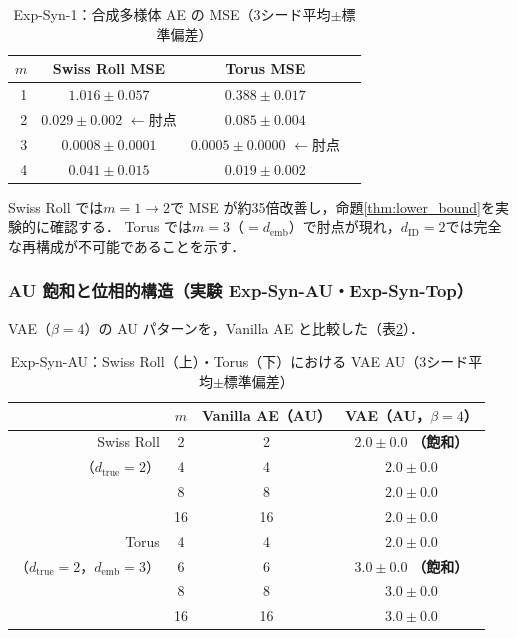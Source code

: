 \documentclass[11pt,a4paper]{jsarticle}
\newcommand{\dID}{d_{\mathrm{ID}}}
\newcommand{\dtrue}{d_{\mathrm{true}}}
\newcommand{\demb}{d_{\mathrm{emb}}}
\begin{document}
\begin{table}[H]
\centering
\caption{Exp-Syn-1：合成多様体 AE の MSE（3シード平均$\pm$標準偏差）}
\label{tab:e1}
\small
\begin{tabular}{rccc}
\toprule
$m$ & Swiss Roll MSE & Torus MSE \\
\midrule
1 & $1.016\pm0.057$ & $0.388\pm0.017$ \\
2 & $\boldsymbol{0.029\pm0.002}$ $\leftarrow$肘点 & $0.085\pm0.004$ \\
3 & $0.0008\pm0.0001$ & $\boldsymbol{0.0005\pm0.0000}$ $\leftarrow$肘点 \\
4 & $0.041\pm0.015$ & $0.019\pm0.002$ \\
\bottomrule
\end{tabular}
\end{table}

Swiss Roll では$m = 1 \to 2$で MSE が約35倍改善し，命題\ref{thm:lower_bound}を実験的に確認する．
Torus では$m = 3$（$= \demb$）で肘点が現れ，$\dID = 2$では完全な再構成が不可能であることを示す．

\subsubsection{AU 飽和と位相的構造（実験 Exp-Syn-AU・Exp-Syn-Top）}

VAE（$\beta = 4$）の AU パターンを，Vanilla AE と比較した（表\ref{tab:ea_summary}）．

\begin{table}[H]
\centering
\caption{Exp-Syn-AU：Swiss Roll（上）・Torus（下）における VAE AU（3シード平均$\pm$標準偏差）}
\label{tab:ea_summary}
\small
\begin{tabular}{rccc}
\toprule
 & $m$ & Vanilla AE（AU） & VAE（AU，$\beta=4$） \\
\midrule
Swiss Roll & 2 & 2 & $2.0\pm0.0$ \textbf{（飽和）} \\
（$\dtrue = 2$） & 4 & 4 & $2.0\pm0.0$ \\
 & 8 & 8 & $2.0\pm0.0$ \\
 & 16 & 16 & $2.0\pm0.0$ \\
\midrule
Torus & 4 & 4 & $2.0\pm0.0$ \\
（$\dtrue = 2$，$\demb = 3$） & 6 & 6 & $3.0\pm0.0$ \textbf{（飽和）} \\
 & 8 & 8 & $3.0\pm0.0$ \\
 & 16 & 16 & $3.0\pm0.0$ \\
\bottomrule
\end{tabular}
\end{table}
\end{document}
